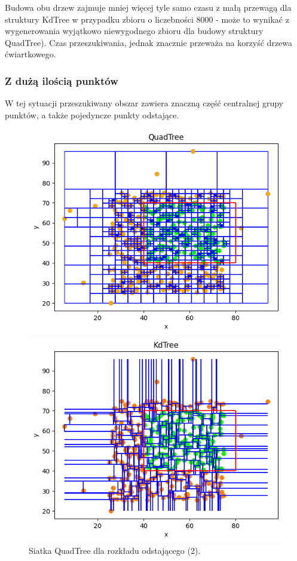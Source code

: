 \documentclass{lab}
\begin{document}
Budowa obu drzew zajmuje mniej więcej tyle samo czasu z małą przewagą dla struktury KdTree w przypadku zbioru o liczebności 8000 - może to wynikać z wygenerowania wyjątkowo niewygodnego zbioru dla budowy struktury QuadTree). Czas przeszukiwania, jednak znacznie przeważa na korzyść drzewa ćwiartkowego.

\newpage
\subsubsection{Z dużą ilością punktów}
W tej sytuacji przeszukiwany obszar zawiera znaczną część centralnej grupy punktów, a także pojedyncze punkty odstające.

\begin{figure}[H]
  \centering
  \begin{minipage}{0.495\textwidth}
      \centering
      \includegraphics[width=1\textwidth]{resources/outlier_QuadTree_2.png}
      \caption{Siatka QuadTree dla rozkładu odstającego (2).}
      \label{fig:outlier_QuadTree_2}
  \end{minipage}
  \begin{minipage}{0.495\textwidth}
      \centering
      \includegraphics[width=1\textwidth]{resources/outlier_KdTree_2.png}

\end{minipage}
\end{figure}
\end{document}
